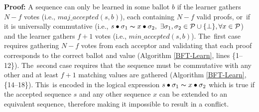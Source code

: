 \documentclass[algorithms,article,accept,moreauthors,pdftex,10pt,a4paper]{Definitions/mdpi}
\begin{document}
\indent\indent\indent\indent\parbox{\linewidth-9mm-\algorithmicindent*4}{\strut\textbf{Proof:} A sequence can only be learned in some ballot $b$ if the learner gathers $N-f$ votes (i.e., $maj\_accepted(s,b)$), each containing $N-f$ valid proofs, or~if it is universally commutative (i.e., $s \bullet \sigma_1 \thicksim x \bullet \sigma_2,\ \exists \sigma_1, \sigma_2 \in \mathcal{P} \cup \{\bot\}, \forall x \in \mathcal{P}$) and the learner gathers $f+1$ votes (i.e., $min\_accepted(s,b)$). The~first case requires gathering $N-f$ votes from each acceptor and validating that each proof corresponds to the correct ballot and value (Algorithm \ref{BFT-Learn}, lines \{1--12\}). The~second case requires that the sequence must be commutative with any other and at least $f+1$ matching values are gathered (Algorithm \ref{BFT-Learn}, \{14--18\}). This~is encoded in the logical expression $s \bullet \sigma_1 \thicksim x \bullet \sigma_2$ which is true if the accepted sequence $s$ and any other sequence $x$ can be extended to an equivalent sequence, therefore making it impossible to result in a conflict.}
\end{document}
